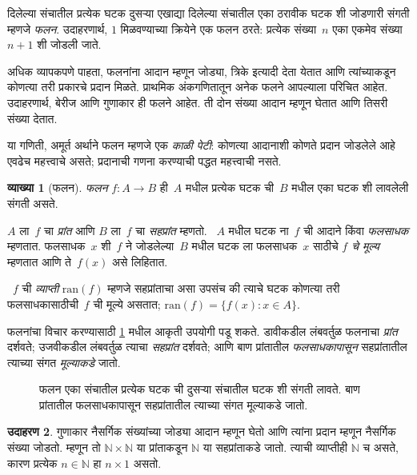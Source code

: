 \documentclass[11pt,a4paper,openany]{book}
\theoremstyle{definition}
\newtheorem{defn}{व्याख्या}[section]
\newtheorem{ex}[defn]{उदाहरण}
\newenvironment{explain}{}{}
\newcommand{\Setabs}[2]{\{#1:#2\}}
\newcommand{\Nat}{\mathbb{N}}
\newcommand{\olasset}[2][0.52\textwidth]{\centering\resizebox{#1}{!}{}}
\newcommand{\ran}[1]{\mathrm{ran}(#1)}
\begin{document}
\begin{explain}
दिलेल्या संचातील प्रत्येक घटक दुसऱ्या एखाद्या दिलेल्या संचातील
एका ठरावीक घटक शी जोडणारी संगती म्हणजे \emph{फलन}.
उदाहरणार्थ, $1$ मिळवण्याच्या क्रियेने एक फलन ठरते: प्रत्येक संख्या~$n$
एका एकमेव संख्या~$n+1$ शी जोडली जाते.

अधिक व्यापकपणे पाहता, फलनांना आदान म्हणून जोड्या, त्रिके इत्यादी देता
येतात आणि त्यांच्याकडून कोणत्या तरी प्रकारचे प्रदान मिळते. प्राथमिक
अंकगणितातून अनेक फलने आपल्याला परिचित आहेत. उदाहरणार्थ, बेरीज आणि
गुणाकार ही फलने आहेत. ती दोन संख्या आदान म्हणून घेतात आणि तिसरी संख्या देतात.

या गणिती, अमूर्त अर्थाने फलन म्हणजे एक \emph{काळी पेटी}: कोणत्या आदानाशी
कोणते प्रदान जोडलेले आहे एवढेच महत्त्वाचे असते; प्रदानाची गणना करण्याची
पद्धत महत्त्वाची नसते.
\end{explain}

\begin{defn}[फलन]
\emph{फलन} $f \colon A \to B$ ही~$A$ मधील प्रत्येक घटक ची~$B$
मधील एका घटक शी लावलेली संगती असते.

$A$ ला~$f$ चा \emph{प्रांत} आणि $B$ ला~$f$ चा \emph{सहप्रांत} म्हणतो.
~$A$ मधील घटक ना~$f$ ची आदाने किंवा \emph{फलसाधक} म्हणतात.
फलसाधक~$x$ शी~$f$ ने जोडलेल्या~$B$ मधील घटक ला फलसाधक~$x$
साठीचे \emph{$f$ चे मूल्य} म्हणतात आणि ते~$f(x)$ असे लिहितात.

~$f$ ची \emph{व्याप्ती} $\ran{f}$ म्हणजे सहप्रांताचा असा उपसंच की
त्याचे घटक कोणत्या तरी फलसाधकासाठीची~$f$ ची मूल्ये असतात;
$\ran{f} = \Setabs{f(x)}{x \in A}$.
\end{defn}

फलनांचा विचार करण्यासाठी \ref{sfr:fun:bas:fig:function} मधील आकृती उपयोगी पडू शकते.
डावीकडील लंबवर्तुळ फलनाचा \emph{प्रांत} दर्शवते; उजवीकडील लंबवर्तुळ
त्याचा \emph{सहप्रांत} दर्शवते; आणि बाण प्रांतातील \emph{फलसाधकापासून}
सहप्रांतातील त्याच्या संगत \emph{मूल्याकडे} जातो.

\begin{figure}
  \olasset{assets/diagrams/function.tikz}
  \caption{फलन एका संचातील प्रत्येक घटक ची दुसऱ्या संचातील
    घटक शी संगती लावते. बाण प्रांतातील फलसाधकापासून
    सहप्रांतातील त्याच्या संगत मूल्याकडे जातो.}
  \label{sfr:fun:bas:fig:function}
\end{figure}

\begin{ex}
गुणाकार नैसर्गिक संख्यांच्या जोड्या आदान म्हणून घेतो आणि त्यांना प्रदान
म्हणून नैसर्गिक संख्या जोडतो. म्हणून तो $\Nat \times \Nat$ या प्रांताकडून
$\Nat$ या सहप्रांताकडे जातो. त्याची व्याप्तीही $\Nat$ च असते, कारण
प्रत्येक $n \in \Nat$ हा $n \times 1$ असतो.
\end{ex}
\end{document}
